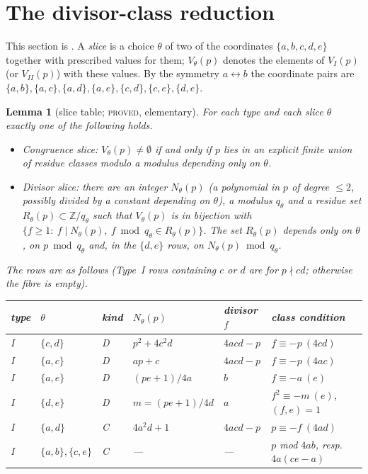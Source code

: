 \documentclass[10pt,reqno]{amsart}
\newtheorem{lemma}[theorem]{Lemma}
\theoremstyle{definition}
\numberwithin{equation}{section}
\newcommand{\Z}{\mathbb Z}
\newcommand{\status}[1]{\textup{\textsc{#1}}}
\begin{document}
\section{The divisor-class reduction}\label{sec:reduction}
This section is \cite[\S2]{RT2}. A \emph{slice} is a choice
$\theta$ of two of the coordinates $\{a,b,c,d,e\}$ together with prescribed
values for them; $V_\theta(p)$ denotes the elements of $V_I(p)$ (or
$V_{II}(p)$) with these values. By the symmetry $a\leftrightarrow b$ the
coordinate pairs are $\{a,b\},\{a,c\},\{a,d\},\{a,e\},\{c,d\},\{c,e\},\{d,e\}$.

\begin{lemma}[slice table; \status{proved}, elementary]\label{lem:slices}
For each type and each slice $\theta$ exactly one of the following holds.
\begin{itemize}
\item[(C)] \emph{Congruence slice:} $V_\theta(p)\neq\emptyset$ if and only if
$p$ lies in an explicit finite union of residue classes modulo a modulus
depending only on $\theta$.
\item[(D)] \emph{Divisor slice:} there are an integer $N_\theta(p)$ (a
polynomial in $p$ of degree $\le2$, possibly divided by a constant depending
on $\theta$), a modulus $q_\theta$ and a residue set $R_\theta(p)\subset\Z/q_\theta$
such that $V_\theta(p)$ is in bijection with
$\{f\ge1:\ f\mid N_\theta(p),\ f\bmod q_\theta\in R_\theta(p)\}$. The set
$R_\theta(p)$ depends only on $\theta$, on $p\bmod q_\theta$ and, in the
$\{d,e\}$ rows, on $N_\theta(p)\bmod q_\theta$.
\end{itemize}
The rows are as follows (Type~I rows containing $c$ or $d$ are for
$p\nmid cd$; otherwise the fibre is empty).
\begin{center}\small
\begin{tabular}{llllll}
\toprule
type & $\theta$ & kind & $N_\theta(p)$ & divisor $f$ & class condition\\
\midrule
I & $\{c,d\}$ & D & $p^2+4c^2d$ & $4acd-p$ & $f\equiv-p\ (4cd)$\\
I & $\{a,c\}$ & D & $ap+c$ & $4acd-p$ & $f\equiv-p\ (4ac)$\\
I & $\{a,e\}$ & D & $(pe+1)/4a$ & $b$ & $f\equiv-a\ (e)$\\
I & $\{d,e\}$ & D & $m=(pe+1)/4d$ & $a$ & $f^2\equiv-m\ (e)$, $(f,e)=1$\\
I & $\{a,d\}$ & C & $4a^2d+1$ & $4acd-p$ & $p\equiv-f\ (4ad)$\\
I & $\{a,b\},\{c,e\}$ & C & --- & --- & $p$ mod $4ab$, resp.\ $4a(ce-a)$\\

\end{tabular}
\end{center}
\end{lemma}
\end{document}

